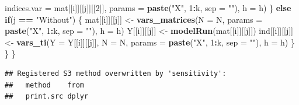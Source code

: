 \documentclass[11pt,]{article}
\newenvironment{Shaded}{\begin{snugshade}}{\end{snugshade}}
\newcommand{\ControlFlowTok}[1]{\textcolor[rgb]{0.13,0.29,0.53}{\textbf{#1}}}
\newcommand{\DataTypeTok}[1]{\textcolor[rgb]{0.13,0.29,0.53}{#1}}
\newcommand{\DecValTok}[1]{\textcolor[rgb]{0.00,0.00,0.81}{#1}}
\newcommand{\KeywordTok}[1]{\textcolor[rgb]{0.13,0.29,0.53}{\textbf{#1}}}
\newcommand{\NormalTok}[1]{#1}
\newcommand{\OperatorTok}[1]{\textcolor[rgb]{0.81,0.36,0.00}{\textbf{#1}}}
\newcommand{\StringTok}[1]{\textcolor[rgb]{0.31,0.60,0.02}{#1}}
\begin{document}
\begin{Shaded}
\begin{Highlighting}[]
                                   \DataTypeTok{indices.var =}\NormalTok{ mat[[i]][[j]][[}\DecValTok{2}\NormalTok{]], }
                                   \DataTypeTok{params =} \KeywordTok{paste}\NormalTok{(}\StringTok{"X"}\NormalTok{, }\DecValTok{1}\OperatorTok{:}\NormalTok{k, }\DataTypeTok{sep =} \StringTok{""}\NormalTok{), }
                                   \DataTypeTok{h =}\NormalTok{ h)}
\NormalTok{    \} }\ControlFlowTok{else} \ControlFlowTok{if}\NormalTok{(j }\OperatorTok{==}\StringTok{ "Without"}\NormalTok{) \{}
\NormalTok{      mat[[i]][[j]] <-}\StringTok{ }\KeywordTok{vars_matrices}\NormalTok{(}\DataTypeTok{N =}\NormalTok{ N, }
                                     \DataTypeTok{params =} \KeywordTok{paste}\NormalTok{(}\StringTok{"X"}\NormalTok{, }\DecValTok{1}\OperatorTok{:}\NormalTok{k, }\DataTypeTok{sep =} \StringTok{""}\NormalTok{), }
                                     \DataTypeTok{h =}\NormalTok{ h)}
\NormalTok{      Y[[i]][[j]] <-}\StringTok{ }\KeywordTok{modelRun}\NormalTok{(mat[[i]][[j]])}
\NormalTok{      ind[[i]][[j]] <-}\StringTok{ }\KeywordTok{vars_ti}\NormalTok{(}\DataTypeTok{Y =}\NormalTok{ Y[[i]][[j]], }
                                   \DataTypeTok{N =}\NormalTok{ N, }
                                   \DataTypeTok{params =} \KeywordTok{paste}\NormalTok{(}\StringTok{"X"}\NormalTok{, }\DecValTok{1}\OperatorTok{:}\NormalTok{k, }\DataTypeTok{sep =} \StringTok{""}\NormalTok{), }
                                   \DataTypeTok{h =}\NormalTok{ h)}
\NormalTok{    \}}
\NormalTok{  \}}
\NormalTok{\}}
\end{Highlighting}
\end{Shaded}

\begin{verbatim}
## Registered S3 method overwritten by 'sensitivity':
##   method    from 
##   print.src dplyr
\end{verbatim}
\end{document}
